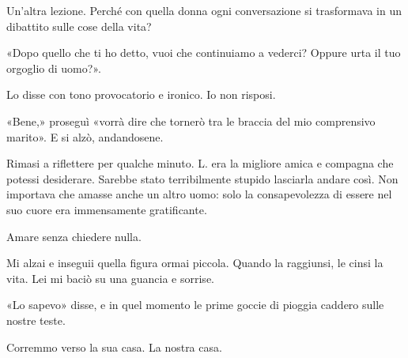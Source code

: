 Un'altra lezione. Perché con quella donna ogni conversazione si trasformava in un dibattito sulle
cose della vita?

«Dopo quello che ti ho detto, vuoi che continuiamo a vederci? Oppure urta il tuo orgoglio di uomo?».

Lo disse con tono provocatorio e ironico. Io non risposi.

«Bene,» proseguì «vorrà dire che tornerò tra le braccia del mio comprensivo marito». E si alzò,
andandosene.

Rimasi a riflettere per qualche minuto. L. era la migliore amica e compagna che potessi desiderare.
Sarebbe stato terribilmente stupido lasciarla andare così. Non importava che amasse anche un altro
uomo: solo la consapevolezza di essere nel suo cuore era immensamente gratificante.

Amare senza chiedere nulla.

Mi alzai e inseguii quella figura ormai piccola. Quando la raggiunsi, le cinsi la vita. Lei mi baciò
su una guancia e sorrise.

«Lo sapevo» disse, e in quel momento le prime goccie di pioggia caddero sulle nostre teste.

Corremmo verso la sua casa. La nostra casa.

